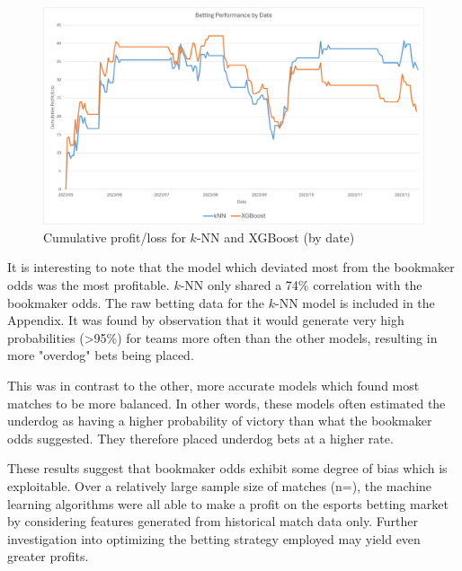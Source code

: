 \begin{figure}[h]
	\centering
	\begin{adjustbox}{center}
		\includegraphics[width=\textwidth]{Figures/profit-date-2.png}
	\end{adjustbox}
	\caption{Cumulative profit/loss for $k$-NN and XGBoost (by date)}
	\label{fig:profit-date}
\end{figure}

It is interesting to note that the model which deviated most from the bookmaker odds was the most profitable. $k$-NN only shared a 74\% correlation with the bookmaker odds. The raw betting data for the $k$-NN model is included in the Appendix. It was found by observation that it would generate very high probabilities (>95\%) for teams more often than the other models, resulting in more "overdog" bets being placed. 

This was in contrast to the other, more accurate models which found most matches to be more balanced. In other words, these models often estimated the underdog as having a higher probability of victory than what the bookmaker odds suggested. They therefore placed underdog bets at a higher rate.

These results suggest that bookmaker odds exhibit some degree of bias which is exploitable. Over a relatively large sample size of matches (n=\matchesBet{}), the machine learning algorithms were all able to make a profit on the esports betting market by considering features generated from historical match data only. Further investigation into optimizing the betting strategy employed may yield even greater profits. 







